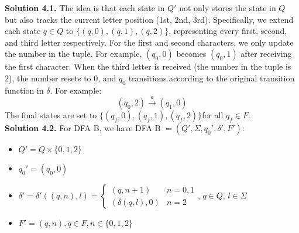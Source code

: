 \documentclass[12pt]{article}
\newcommand{\solution}[1]{\noindent \textbf{Solution #1.}}
\begin{document}
\solution{4.1} 
The idea is that each state in \( Q' \) not only stores the state in \( Q \) but also tracks the current letter position (1st, 2nd, 3rd). Specifically, we extend each state \( q \in Q \) to $\{(q,0) , (q,1) , (q,2) \}$, representing every first, second, and third letter respectively. For the first and second characters, we only update the number in the tuple. For example, \( (q_0,0) \) becomes \( (q_0,1) \) after receiving the first character. When the third letter is received (the number in the tuple is 2), the number resets to 0, and \( q_0 \) transitions according to the original transition function in $\delta$. For example:
\[
(q_0,2) \xrightarrow{a} (q_1,0)
\]
The final states are set to $\{(q_f, 0), (q_f, 1), (q_f, 2)\}$for all \( q_f \in F \).\\



\solution{4.2} 
For DFA B, we have DFA B $= (Q',\Sigma,q_0',\delta',F')$:

\begin{itemize}
  \item $Q' = Q \times \{0,1,2\}$
  \item $q_0' = (q_0,0)$
  \item $\delta' = \delta'((q,n),l) = \left\{
      \begin{array}{ll}
      \text{$(q,n+1)$} & \text{$n = 0,1$} \\
      \text{$(\delta(q,l),0)$} & \text{$n = 2$}
      \end{array}
      \right.$, $q \in Q$, $l \in \Sigma$
  \item $F' = (q,n),q \in F,n \in \{0,1,2\}$

\end{itemize}
\end{document}
